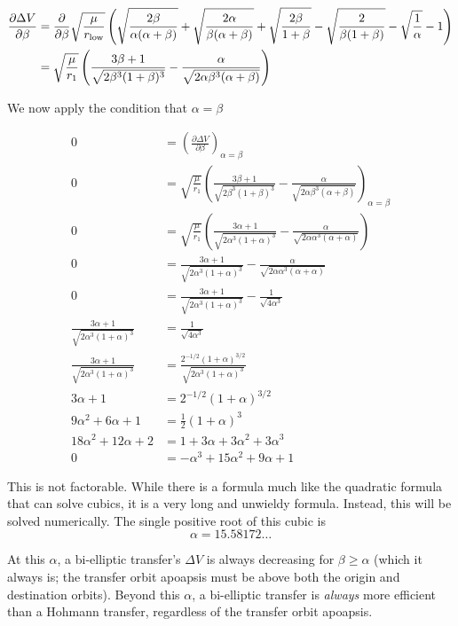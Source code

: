 \documentclass[../basicOrbitalDynamics.tex]{subfiles}
\begin{document}
\begin{align*}
    \frac{\partial\Delta V}{\partial\beta}&= \frac{\partial}{\partial\beta}\sqrt{\frac{\mu}{{r}_\text{low}}}\left(\sqrt{\frac{2\beta}{\alpha(\alpha+\beta)}}+\sqrt{\frac{2\alpha}{\beta(\alpha+\beta)}}+\sqrt{\frac{2\beta}{1+\beta}}-\sqrt{\frac{2}{\beta(1+\beta)}}-\sqrt{\frac{1}{\alpha}}-1\right) \\
    &= \sqrt{\frac{\mu}{r_1}}\left(\frac{3\beta+1}{\sqrt{2\beta^3(1+\beta)^3}}-\frac{\alpha}{\sqrt{2\alpha\beta^3(\alpha+\beta)}}\right)
\end{align*}

We now apply the condition that $\alpha=\beta$

\begin{align*}
    0 &= \left(\frac{\partial\Delta V}{\partial\beta}\right)_{\alpha=\beta} \\
    0 &= \sqrt{\frac{\mu}{r_1}}\left(\frac{3\beta+1}{\sqrt{2\beta^3(1+\beta)^3}}-\frac{\alpha}{\sqrt{2\alpha\beta^3(\alpha+\beta)}}\right)_{\alpha=\beta} \\
    0 &=\sqrt{\frac{\mu}{r_1}}\left(\frac{3\alpha+1}{\sqrt{2\alpha^3(1+\alpha)^3}}-\frac{\alpha}{\sqrt{2\alpha\alpha^3(\alpha+\alpha)}}\right) \\
    0 &=\frac{3\alpha+1}{\sqrt{2\alpha^3(1+\alpha)^3}}-\frac{\alpha}{\sqrt{2\alpha\alpha^3(\alpha+\alpha)}} \\
    0 &=\frac{3\alpha+1}{\sqrt{2\alpha^3(1+\alpha)^3}}-\frac{1}{\sqrt{4\alpha^3}} \\
    \frac{3\alpha+1}{\sqrt{2\alpha^3(1+\alpha)^3}} &=\frac{1}{\sqrt{4\alpha^3}} \\
    \frac{3\alpha+1}{\sqrt{2\alpha^3(1+\alpha)^3}} &=\frac{2^{-1/2}(1+\alpha)^{3/2}}{\sqrt{2\alpha^3(1+\alpha)^3}} \\
    3\alpha+1&=2^{-1/2}(1+\alpha)^{3/2} \\
    9\alpha^2+6\alpha+1&=\frac{1}{2}(1+\alpha)^3 \\
    18\alpha^2+12\alpha+2 &=1+3\alpha+3\alpha^2+3\alpha^3 \\
    0 &=-\alpha^3+15\alpha^2+9\alpha+1
\end{align*}

This is not factorable. While there is a formula much like the quadratic formula that can solve cubics, it is a very long and unwieldy formula. Instead, this will be solved numerically. The single positive root of this cubic is
\[\alpha=15.58172\dots\]

At this $\alpha$, a bi-elliptic transfer's $\Delta V$ is always decreasing for $\beta\geq\alpha$ (which it always is; the transfer orbit apoapsis must be above both the origin and destination orbits). Beyond this $\alpha$, a bi-elliptic transfer is \textit{always} more efficient than a Hohmann transfer, regardless of the transfer orbit apoapsis.
\end{document}
